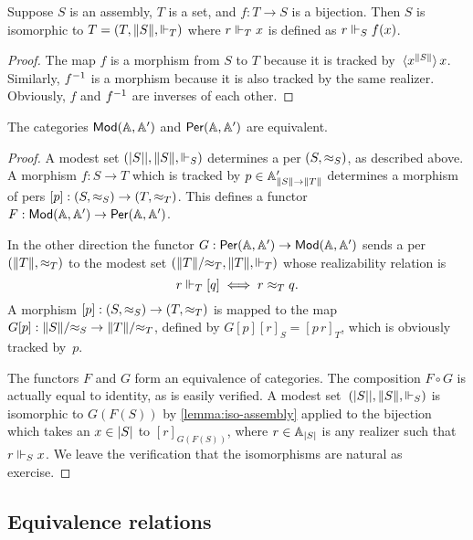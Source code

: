 \begin{lemma}
  \label{lemma:iso-assembly}
  Suppose $S$ is an assembly, $T$ is a set, and $f : T \to S$ is
  a bijection. Then $S$ is isomorphic to $T = (T, \T{S},
  {\rz[T]})$ where $r \rz[T] x$ is defined as $r \rz[S] f(x)$.
\end{lemma}


\begin{proof}
  The map $f$ is a morphism from $S$ to $T$ because it is
  tracked by~$\tpcalam{x}{\T{S}}{x}$. Similarly, $\inv{f}$ is a
  morphism because it is also tracked by the same realizer. Obviously,
  $f$ and $\inv{f}$ are inverses of each other.
\end{proof}


\begin{proposition}
  The categories $\Mod{\AA, \subAA}$ and $\Per{\AA, \subAA}$ are
  equivalent.
\end{proposition}

\begin{proof}
  A modest set $\xasm{S}$ determines a per $(S, {\per_S})$,
  as described above. A morphism $f : S \to T$ which is tracked by $p
  \in \subAtyp{\T{S} \to \T{T}}$ determines a morphism of pers $[p] : (S,
  {\per_S}) \to (T, {\per_T})$. This defines a functor $F : \Mod{\AA,
    \subAA} \to \Per{\AA, \subAA}$.

  In the other direction the functor $G : \Per{\AA, \subAA} \to
  \Mod{\AA, \subAA}$ sends a per $(\T{T}, {\per_T})$ to the modest set
  $(\|T\|/{\per_T}, \T{T}, {\rz[T]})$ whose realizability relation is
  \begin{equation*}
    r \rz[T] [q] \iff r \per_T q.
  \end{equation*}
  A morphism $[p] : (S, {\per_S}) \to (T, {\per_T})$ is mapped to the
  map $G [p] : \|S\|/{\per_S} \to \|T\|/{\per_T}$, defined by $G [p]
  [r]_S = [p\,r]_T$, which is obviously tracked by~$p$.

  The functors $F$ and $G$ form an equivalence of categories. The
  composition $F \circ G$ is actually equal to identity, as is easily
  verified. A modest set~$\xasm{S}$ is isomorphic to
  $G(F(S))$ by \cref{lemma:iso-assembly} applied to the bijection
  which takes an $x \in \S{S}$ to $[r]_{G(F(S))}$, where $r \in \xAtyp{S}$
  is any realizer such that $r \rz[S] x$. We leave the verification
  that the isomorphisms are natural as exercise.
\end{proof}


\subsection{Equivalence relations}
\label{sec:ers}

